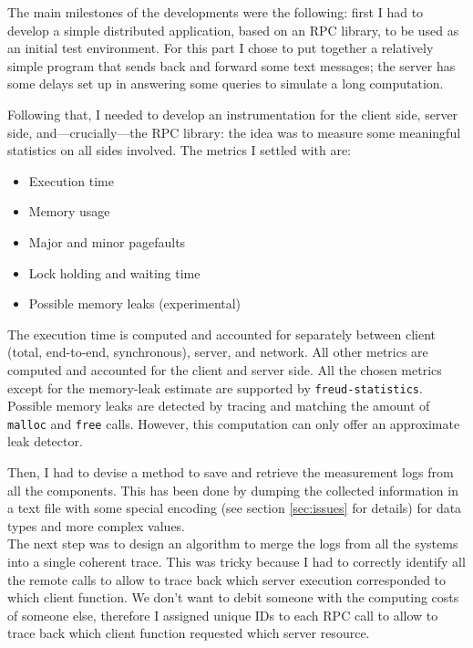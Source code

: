         The main milestones of the developments were the following: first I had to develop a
        simple distributed application, based on an RPC library, to be used as an initial test environment.
        For this part I chose to put together a relatively simple program that sends back and forward
        some text messages; the server has some delays set up in answering some queries to simulate a
        long computation.

        Following that, I needed to develop an instrumentation for the
        client side, server side, and---crucially---the RPC library:
        the idea was to measure some meaningful statistics on all
        sides involved.  The metrics I settled with are:

        \begin{itemize}
            \item Execution time
            \item Memory usage
            \item Major and minor pagefaults
            \item Lock holding and waiting time
            \item Possible memory leaks (experimental)
        \end{itemize}

        The execution time is computed and accounted for separately
        between client (total, end-to-end, synchronous), server, and
        network.  All other metrics are computed and accounted for the
        client and server side.  All the chosen metrics except for the
        memory-leak estimate are supported by
        \texttt{freud-statistics}.  Possible memory leaks are detected
        by tracing and matching the amount of \texttt{malloc} and
        \texttt{free} calls.  However, this computation can only offer
        an approximate leak detector.

        Then, I had to devise a method to save and retrieve the measurement logs from all the components.
        This has been done by dumping the collected information in a text file with some special encoding
        (see section \ref{sec:issues} for details) for data types and more complex values.\\

        The next step was to design an algorithm to merge the logs from all the systems into a single
        coherent trace. This was tricky because I had to correctly identify all the remote calls to allow
        to trace back which server execution corresponded to which client function. We don't want to debit
        someone with the computing costs of someone else, therefore I assigned unique IDs to each
        RPC call to allow to trace back which client function requested which server resource.\\

